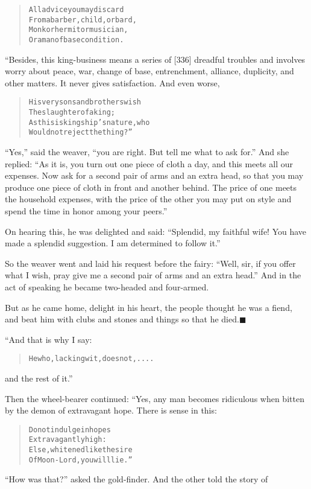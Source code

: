 \documentclass[article, twoside, 14pt]{memoir}
\newcommand{\qed}{\hfill \ensuremath{\blacksquare}}
\renewenvironment{verbatim}{%
\begin{quote}%
\vskip -10pt%
\begin{alltt}\normalfont\large}{\end{alltt}%
\end{quote}%
\vskip -10pt
} %
\begin{document}
\begin{verbatim}
All advice you may discard
From a barber, child, or bard,
Monk or hermit or musician,
Or a man of base condition.
\end{verbatim}
“Besides, this king-business means a series of [336] dreadful
troubles and involves worry about peace, war, change of base,
entrenchment, alliance, duplicity, and other matters. It never
gives satisfaction. And even worse,

\begin{verbatim}
His very sons and brothers wish
    The slaughter of a king;
As this is kingship's nature, who
    Would not reject the thing?”
\end{verbatim}
``Yes,'' said the weaver,
``you are right. But tell me what to ask for.'' And she replied:
``As it is, you turn out one piece of cloth a day, and this meets all our expenses. Now ask for a second pair of arms and an extra head, so that you may produce one piece of cloth in front and another behind. The price of one meets the household expenses, with the price of the other you may put on style and spend the time in honor among your peers.''

On hearing this, he was delighted and said:
``Splendid, my faithful wife! You have made a splendid suggestion. I am determined to follow it.''

So the weaver went and laid his request before the fairy:
``Well, sir, if you offer what I wish, pray give me a second pair of arms and an extra head.''
And in the act of speaking he became two-headed and four-armed.

But as he came home, delight in his heart, the people thought he
was a fiend, and beat him with clubs and stones and things so that
he died.\hyperref[s85]{\qed}

“And that is why I say:

\begin{verbatim}
He who, lacking wit, does not,....
\end{verbatim}
and the rest of it.”

Then the wheel-bearer continued: “Yes, any man becomes ridiculous
when bitten by the demon of extravagant hope. There is sense in
this:

\begin{verbatim}
Do not indulge in hopes
    Extravagantly high:
Else, whitened like the sire
    Of Moon-Lord, you will lie.”
\end{verbatim}
``How was that?'' asked the gold-finder. And the other told the
story of
\end{document}
